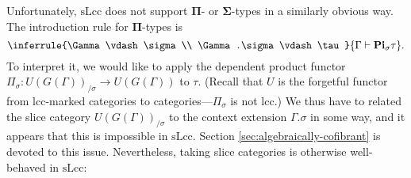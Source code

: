 \documentclass{article}
\theoremstyle{remark}
\theoremstyle{definition}
\begin{document}
Unfortunately, $\mathrm{sLcc}$ does not support $\mathbf{\Pi}$- or $\mathbf{\Sigma}$-types in a similarly obvious way.
The introduction rule for $\mathbf{\Pi}$-types is
\begin{equation}
  \inferrule
  {\Gamma \vdash \sigma \\ \Gamma.\sigma \vdash \tau}
  {\Gamma \vdash \mathbf{Pi}_\sigma \tau}.
\end{equation}
To interpret it, we would like to apply the dependent product functor $\Pi_\sigma : U(G(\Gamma))_{/ \sigma} \rightarrow U(G(\Gamma))$ to $\tau$.
(Recall that $U$ is the forgetful functor from lcc-marked categories to categories---$\Pi_\sigma$ is not lcc.)
We thus have to related the slice category $U(G(\Gamma))_{/ \sigma}$ to the context extension $\Gamma.\sigma$ in some way, and it appears that this is impossible in $\mathrm{sLcc}$.
Section \ref{sec:algebraically-cofibrant} is devoted to this issue.
Nevertheless, taking slice categories is otherwise well-behaved in $\mathrm{sLcc}$:
\end{document}
